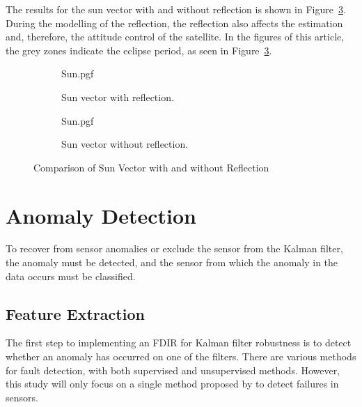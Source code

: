 \documentclass[letterpaper, 10 pt, conference]{ieeeconf}  %
\begin{document}
The results for the sun vector with and without reflection is shown in Figure~\ref{fig:Sun Vector comparison}. During the modelling of the reflection, the reflection also affects the estimation and, therefore, the attitude control of the satellite. In the figures of this article, the grey zones indicate the eclipse period, as seen in Figure~\ref{fig:Sun Vector comparison}.

\begin{figure}[!htb]
	\begin{subfigure}{.5\textwidth}
		\centering
		{Sun.pgf}
		\caption[Sun vector with reflection]{Sun vector with reflection.}
		\label{fig:Sun Vector comparison with reflection}
	\end{subfigure}
	\begin{subfigure}{.5\textwidth}
		\centering
		{Sun.pgf} 
		\caption[Sun vector without reflection]{Sun vector without reflection.}
		\label{fig:Sun Vector comparison without reflection}
	\end{subfigure}
	
	\caption{Comparison of Sun Vector with and without Reflection}
	\label{fig:Sun Vector comparison}
	
\end{figure}


\section{Anomaly Detection}
To recover from sensor anomalies or exclude the sensor from the Kalman filter, the anomaly must be detected, and the sensor from which the anomaly in the data occurs must be classified.

\subsection{Feature Extraction}
The first step to implementing an FDIR for Kalman filter robustness is to detect whether an anomaly has occurred on one of the filters. There are various methods for fault detection, with both supervised and unsupervised methods. However, this study will only focus on a single method proposed by \textcite{DeSilva2020} to detect failures in sensors.
\end{document}
